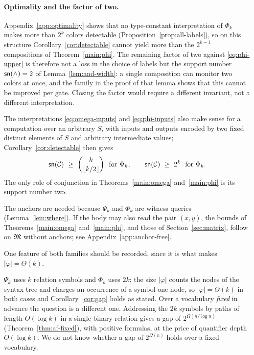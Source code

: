 \paragraph{Optimality and the factor of two.}
Appendix~\ref{app:optimality} shows that no type-constant interpretation of
$\Phi_k$ makes more than $2^k$ colors detectable
(Proposition~\ref{prop:all-labels}), so on this structure
Corollary~\ref{cor:detectable} cannot yield more than the $2^{k-1}$
compositions of Theorem~\ref{main:phi}. The remaining factor of two against
\eqref{eq:phi-upper} is therefore not a loss in the choice of labels but the
support number $\mathsf{sn}(\land)=2$ of Lemma~\ref{lem:and-width}: a single
composition can monitor two colors at once, and the family in the proof of
that lemma shows that this cannot be improved per gate. Closing the factor
would require a different invariant, not a different interpretation.

The interpretations \eqref{eq:omega-inputs} and \eqref{eq:phi-inputs} also
make sense for a computation over an arbitrary $S$, with inputs and outputs
encoded by two fixed distinct elements of $S$ and arbitrary intermediate
values; Corollary~\ref{cor:detectable} then gives
\[
 \wid{\Comp}\ \ge\ \binom{k}{\lfloor k/2\rfloor}\ \text{ for }\Psi_k,
 \qquad
 \wid{\Comp}\ \ge\ 2^k\ \text{ for }\Phi_k.
\]
The only role of conjunction in Theorems~\ref{main:omega} and~\ref{main:phi}
is its support number two.

\begin{remark}\label{rem:anchor-free}
The anchors are needed because $\Psi_k$ and $\Phi_k$ are witness queries
(Lemma~\ref{lem:where}). If the body may also read the pair $(x,y)$, the
bounds of Theorems~\ref{main:omega} and~\ref{main:phi}, and those of
Section~\ref{sec:matrix}, follow on $\mathfrak M$ without anchors; see
Appendix~\ref{app:anchor-free}.
\end{remark}

One feature of both families should be recorded, since it is what makes
$|\varphi|=\Theta(k)$.

\begin{remark}\label{rem:vocabulary}
$\Psi_k$ uses $k$ relation symbols and $\Phi_k$ uses $2k$; the size
$|\varphi|$ counts the nodes of the syntax tree and charges an occurrence of
a symbol one node, so $|\varphi|=\Theta(k)$ in both cases and
Corollary~\ref{cor:gap} holds as stated. Over a vocabulary \emph{fixed} in
advance the question is a different one. Addressing the $2k$ symbols by
paths of length $O(\log k)$ in a single binary relation gives a gap of
$2^{\Omega(n/\log n)}$ (Theorem~\ref{thm:af-fixed}), with positive
formulas, at the price of quantifier depth $O(\log k)$. We do not know whether a gap of
$2^{\Omega(n)}$ holds over a fixed vocabulary.
\end{remark}
